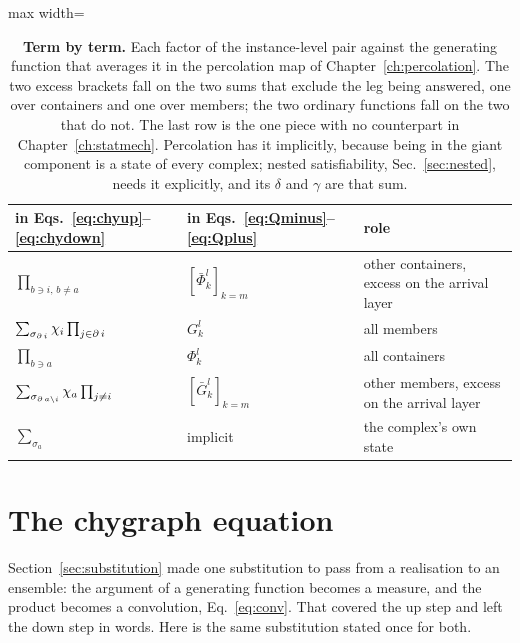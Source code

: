 \begin{table}[tb]
\centering\small
\begin{adjustbox}{max width=\linewidth}
\begin{tabular}{lll}
\hline\hline
in Eqs.~\eqref{eq:chyup}--\eqref{eq:chydown}
  & in Eqs.~\eqref{eq:Qminus}--\eqref{eq:Qplus} & role\\
\hline
$\prod_{b\ni i,\,b\ne a}$ & $[\bar\Phi^{l}_{k}]_{k=m}$
  & other containers, excess on the arrival layer\\
$\sum_{\sigma_{\operatorname{\partial} i}}\chi_{i}\prod_{j\in\operatorname{\partial} i}$ & $G^{l}_{k}$
  & all members\\
$\prod_{b\ni a}$ & $\Phi^{l}_{k}$
  & all containers\\
$\sum_{\sigma_{\operatorname{\partial} a\setminus i}}\chi_{a}\prod_{j\ne i}$
  & $[\bar G^{l}_{k}]_{k=m}$
  & other members, excess on the arrival layer\\
$\sum_{\sigma_{a}}$ & implicit
  & the complex's own state\\
\hline\hline
\end{tabular}
\end{adjustbox}
\caption{\textbf{Term by term.} Each factor of the instance-level pair against
the generating function that averages it in the percolation map of
Chapter~\ref{ch:percolation}. The two excess brackets fall on the two sums
that exclude the leg being answered, one over containers and one over
members; the two ordinary functions fall on the two that do not. The last row
is the one piece with no counterpart in Chapter~\ref{ch:statmech}.
Percolation has it implicitly, because being in the giant component is a
state of every complex; nested satisfiability, Sec.~\ref{sec:nested}, needs
it explicitly, and its $\delta$ and $\gamma$ are that sum.}
\label{tab:ce-termbyterm}
\end{table}

\section{The chygraph equation}
\label{sec:ce-equation}

Section~\ref{sec:substitution} made one substitution to pass from a
realisation to an ensemble: the argument of a generating function becomes a
measure, and the product becomes a convolution, Eq.~\eqref{eq:conv}. That
covered the up step and left the down step in words. Here is the same
substitution stated once for both.

